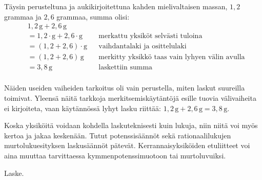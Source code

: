 \begin{esimerkki}
Täysin perusteltuna ja aukikirjoitettuna kahden mielivaltaisen massan, $1,2$ grammaa ja $2,6$ grammaa, summa olisi:
\begin{align*}
&1,2\,\text{g}+2,6\,\text{g} && \\
&=1,2\cdot \text{g}+2,6\cdot \text{g} && \text{merkattu yksiköt selvästi tuloina} \\
&=(1,2+2,6)\cdot \text{g} && \text{vaihdantalaki ja osittelulaki} \\ %
&=(1,2+2,6)\,\text{g} && \text{merkitty yksikkö taas vain lyhyen välin avulla} \\
&=3,8\,\text{g} && \text{laskettiin summa} \\
\end{align*}

Näiden useiden vaiheiden tarkoitus oli vain perustella, miten laskut suureilla toimivat. Yleensä näitä tarkkoja merkitsemiskäytäntöjä esille tuovia välivaiheita ei kirjoiteta, vaan käytännössä lyhyt lasku riittää: $1,2\,\text{g}+2,6\,\text{g}=3,8\,\text{g}$.
\end{esimerkki}

Koska yksiköitä voidaan kohdella laskuteknisesti kuin lukuja, niin niitä voi myös kertoa ja jakaa keskenään. Tutut potenssisäännöt sekä rationaalilukujen murtolukuesityksen laskusäännöt pätevät. Kerrannaisyksiköiden etuliitteet voi aina muuttaa tarvittaessa kymmenpotenssimuotoon tai murtoluvuiksi.

\begin{esimerkki}
Laske.
\end{esimerkki}

